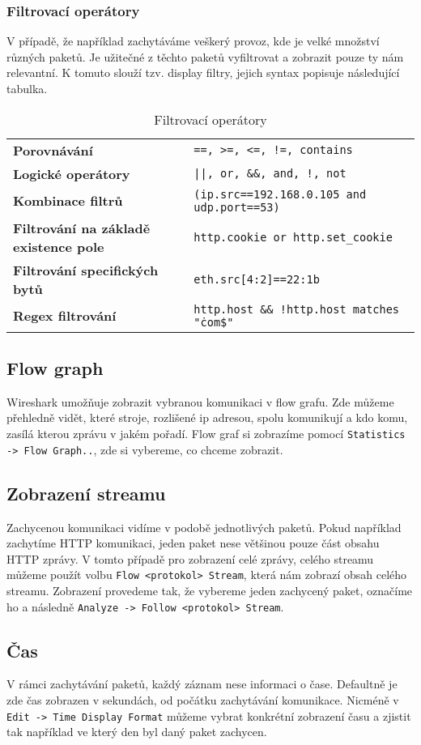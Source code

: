 \subsubsection{Filtrovací operátory}
V případě, že například zachytáváme veškerý provoz, kde je velké množství různých paketů. Je užitečné z těchto paketů vyfiltrovat a zobrazit pouze ty nám relevantní. K tomuto slouží tzv. display filtry, jejich syntax popisuje následující tabulka.
\begin{center}
\begin{table}[h]
\centering
\def\arraystretch{1.2}
\begin{tabular}{|l|l|}
\hline
\textbf{Porovnávání} & \texttt{==, >=, <=, !=, contains}\\
\textbf{Logické operátory} & \texttt{||, or, \&\&, and, !, not}\\
\textbf{Kombinace filtrů} & \texttt{(ip.src==192.168.0.105 and udp.port==53)}\\
\textbf{Filtrování na základě existence pole} & \texttt{http.cookie or http.set\_cookie}\\
\textbf{Filtrování specifických bytů} & \texttt{eth.src[4:2]==22:1b}\\
\textbf{Regex filtrování} & \texttt{http.host \&\& !http.host matches "\.com\$"}\\
\hline
\end{tabular}
\caption{Filtrovací operátory}
\end{table}
\end{center}


\subsection{Flow graph}
Wireshark umožňuje zobrazit vybranou komunikaci v flow grafu. Zde můžeme přehledně vidět, které stroje, rozlišené ip adresou, spolu komunikují a kdo komu, zasílá kterou zprávu v jakém pořadí.
Flow graf si zobrazíme pomocí \texttt{Statistics -> Flow Graph..}, zde si vybereme, co chceme zobrazit.
\subsection{Zobrazení streamu}
Zachycenou komunikaci vidíme v podobě jednotlivých paketů. Pokud například zachytíme HTTP komunikaci, jeden paket nese většinou pouze část obsahu HTTP zprávy. V tomto případě pro zobrazení celé zprávy, celého streamu můžeme použít volbu \texttt{Flow <protokol> Stream}, která nám zobrazí obsah celého streamu. Zobrazení provedeme tak, že vybereme jeden zachycený paket, označíme ho a následně \texttt{Analyze -> Follow <protokol> Stream}.
\subsection{Čas}
V rámci zachytávání paketů, každý záznam nese informaci o čase. Defaultně je zde čas zobrazen v sekundách, od počátku zachytávání komunikace. Nicméně v \texttt{Edit -> Time Display Format} můžeme vybrat konkrétní zobrazení času a zjistit tak například ve který den byl daný paket zachycen.
